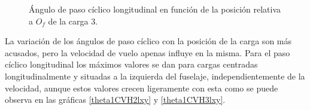 \begin{figure}
	\centering
	\caption{Ángulo de paso cíclico longitudinal en función de la posición relativa a $O_f$ de la carga 3.}
	\label{theta1CVC3lxy}
\end{figure}

La variación de los ángulos de paso cíclico con la posición de la carga son más acusados, pero la velocidad de vuelo apenas influye en la misma. Para el paso cíclico longitudinal los máximos valores se dan para cargas centradas longitudinalmente y situadas a la izquierda del fuselaje, independientemente de la velocidad, aunque estos valores crecen ligeramente con esta como se puede observa en las gráficas \ref{theta1CVH2lxy} y \ref{theta1CVH3lxy}.

